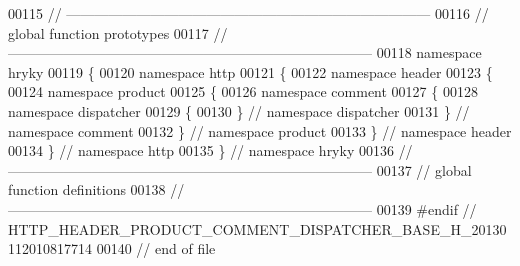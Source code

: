 \begin{DoxyCode}
00115 \textcolor{comment}{//
      ------------------------------------------------------------------------------}
00116 \textcolor{comment}{// global function prototypes}
00117 \textcolor{comment}{//
      ------------------------------------------------------------------------------}
00118 \textcolor{keyword}{namespace }hryky
00119 \{
00120 \textcolor{keyword}{namespace }http
00121 \{
00122 \textcolor{keyword}{namespace }header
00123 \{
00124 \textcolor{keyword}{namespace }product
00125 \{
00126 \textcolor{keyword}{namespace }comment
00127 \{
00128 \textcolor{keyword}{namespace }dispatcher
00129 \{
00130 \} \textcolor{comment}{// namespace dispatcher}
00131 \} \textcolor{comment}{// namespace comment}
00132 \} \textcolor{comment}{// namespace product}
00133 \} \textcolor{comment}{// namespace header}
00134 \} \textcolor{comment}{// namespace http}
00135 \} \textcolor{comment}{// namespace hryky}
00136 \textcolor{comment}{//
      ------------------------------------------------------------------------------}
00137 \textcolor{comment}{// global function definitions}
00138 \textcolor{comment}{//
      ------------------------------------------------------------------------------}
00139 \textcolor{preprocessor}{#endif // HTTP\_HEADER\_PRODUCT\_COMMENT\_DISPATCHER\_BASE\_H\_20130112010817714}
00140 \textcolor{preprocessor}{}\textcolor{comment}{// end of file}
\end{DoxyCode}

